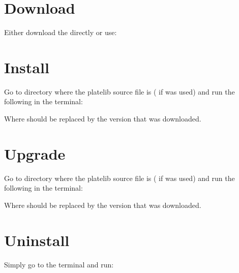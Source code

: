 \documentclass[letterpaper,10pt,english]{sphinxmanual}
\begin{document}
\section{Download}
\label{\detokenize{install:download}}
Either download the  directly or use:
\begin{quote}

\end{quote}


\section{Install}
\label{\detokenize{install:install}}
Go to directory where the platelib source file is ( if  was used) and run the following in the terminal:

%
\begin{sphinxVerbatim}[commandchars=\\\{\}]
  
\end{sphinxVerbatim}

Where  should be replaced by the version that was downloaded.


\section{Upgrade}
\label{\detokenize{install:upgrade}}
Go to directory where the platelib source file is ( if  was used) and run the following in the terminal:

%
\begin{sphinxVerbatim}[commandchars=\\\{\}]
   
\end{sphinxVerbatim}

Where  should be replaced by the version that was downloaded.


\section{Uninstall}
\label{\detokenize{install:uninstall}}
Simply go to the terminal and run:
\end{document}
